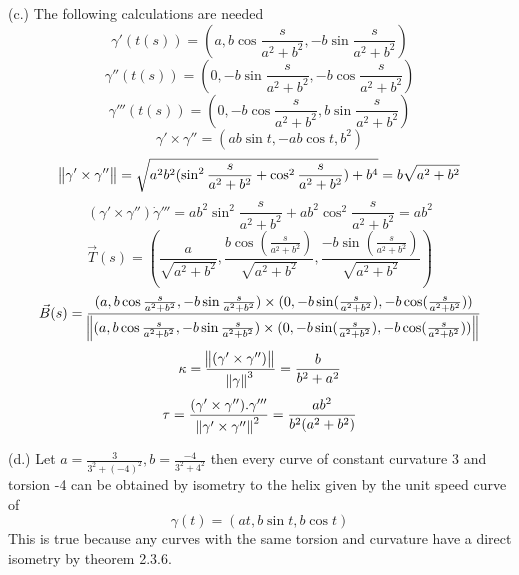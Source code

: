 \begin{solution}
  \item[(c.)]
    The following calculations are needed
    \[
\gamma'(t(s)) = (a, b \cos \frac{s}{a^{2}+b^{2}}, -b \sin \frac{s}{a^{2}+b^{2}})
\]
    \[
\gamma''(t(s)) = (0, -b \sin \frac{s}{a^{2}+b^{2}}, -b \cos \frac{s}{a^{2}+b^{2}})
\]
    \[
\gamma'''(t(s)) = (0, -b \cos \frac{s}{a^{2}+b^{2}}, b \sin \frac{s}{a^{2}+b^{2}})
\]
    \[
\gamma'\times\gamma'' = (ab\sin t, -ab\cos t, b^{2})
\]
    \[
\norm{\gamma'\times\gamma''} = \sqrt{a^{2}b^{2}(\sin^{2} \frac{s}{a^{2}+b^{2}} +
        \cos^{2} \frac{s}{a^{2}+b^{2}}) + b^{4}} = b\sqrt{a^{2}+b^{2}}
\]
    \[
(\gamma'\times\gamma'') \dot \gamma''' =
      ab^{2}\sin^{2}\frac{s}{a^{2}+b^{2}}+ab^{2}\cos^{2}\frac{s}{a^{2}+b^{2}} = ab^{2}
\]
    \[
\vec{T}(s) = (\frac{a}{\sqrt{a^{2}+b^{2}}},
      \frac{b\cos(\frac{s}{a^{2}+b^{2}})}{\sqrt{a^{2}+b^{2}}}, \frac{-b\sin(\frac{s}{a^{2}+b^{2}})}{\sqrt{a^{2}+b^{2}}})
\]
    \[
\vec{B}(s) = \frac{(a, b \cos \frac{s}{a^{2}+b^{2}}, -b \sin \frac{s}{a^{2}+b^{2}}) \times (0, -b\sin(\frac{s}{a^{2}+b^{2}}), -b\cos(\frac{s}{a^{2}+b^{2}}))}{\norm{(a, b \cos \frac{s}{a^{2}+b^{2}}, -b \sin \frac{s}{a^{2}+b^{2}}) \times (0, -b\sin(\frac{s}{a^{2}+b^{2}}), -b\cos(\frac{s}{a^{2}+b^{2}}))}}
\]
    \[
\kappa = \frac{\norm{(\gamma'\times\gamma'')}}{\norm{\gamma}^{3}} = \frac{b}{b^{2}+a^{2}}
\]
    \[
\tau = \frac{(\gamma'\times\gamma'') . \gamma'''}{\norm{\gamma'\times\gamma''}^{2}} = \frac{ab^{2}}{b^{2}(a^{2}+b^{2})}
\]
  \item[(d.)]
    Let \(a = \frac{3}{3^{2}+(-4)^{2}}, b = \frac{-4}{3^{2}+4^{2}}\) then every
    curve of constant curvature 3 and torsion -4 can be obtained by isometry to
    the helix given by the unit speed curve of
\[
\gamma(t) = (at, b \sin t, b \cos t)
\]
    This is true because any curves with the same torsion and curvature have a
    direct isometry by theorem 2.3.6.
  \end{solution}

